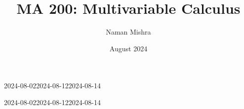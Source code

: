 \documentclass[12pt]{report}
\title{MA 200: Multivariable Calculus}
\author{Naman Mishra}
\date{August 2024}
\begin{document}
\maketitle
\tableofcontents
\newpage
\listoflecture
\listofhw
    
    
    
    
        {2024-08-02}{2024-08-12}{2024-08-14}
    
    
    
    
    
    
        {2024-08-02}{2024-08-12}{2024-08-14}
\end{document}
